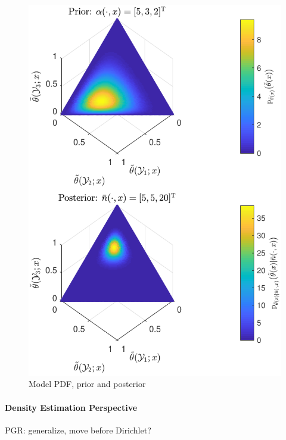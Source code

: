 \documentclass[12pt]{article}
\begin{document}
\begin{figure}
\centering
\includegraphics[width=0.7\linewidth]{P_theta_post_tilde.pdf}
\caption{Model PDF, prior and posterior}
\end{figure}





\paragraph{Density Estimation Perspective} \label{sec:predictive_est}

PGR: generalize, move before Dirichlet?
\end{document}
